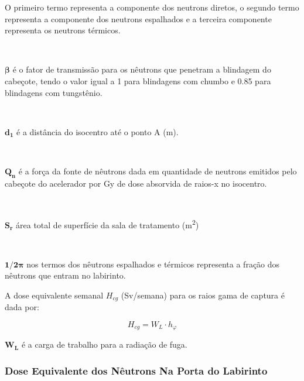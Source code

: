 \documentclass[11pt,a4paper]{article}
\newcounter{exemplo}
\begin{document}
        \begin{exemplo}[onde:]
                O primeiro termo representa a componente dos neutrons diretos, o segundo termo representa a componente dos neutrons espalhados e a terceira componente representa os neutrons térmicos.

                \

                \textcolor{CarnationPink}{$\mathbf{\beta}$} é o fator de transmissão para os nêutrons que penetram a blindagem do cabeçote, tendo o valor igual a 1 para blindagens com chumbo e 0.85 para blindagens com tungstênio.

                \

                \textcolor{CarnationPink}{$\mathbf{d_1}$} é a distância do isocentro até o ponto A (m).

                \

                \textcolor{CarnationPink}{$\mathbf{Q_n}$} é a força da fonte de nêutrons dada em quantidade de neutrons emitidos pelo cabeçote do acelerador por Gy de dose absorvida de raios-x no isocentro.

                \

                \textcolor{CarnationPink}{$\mathbf{S_r}$} área total de superfície  da sala de tratamento (\unit{m^2})

                \

                \textcolor{CarnationPink}{$\mathbf{1/2\pi}$} nos termos dos nêutrons espalhados e térmicos representa a fração dos nêutrons que entram no labirinto.
        \end{exemplo}

        A dose equivalente semanal $H_{cg}$ (Sv/semana) para os raios gama de captura é dada por:

            \begin{equation}
                H_{cg} = W_L \cdot h_{\varphi}
                \label{eq:doseEquivalenteRaiosGamaCaptura}
            \end{equation}

        \begin{exemplo}[onde:]
            \textcolor{CarnationPink}{$\mathbf{W_L}$} é a carga de trabalho para a radiação de fuga.
        \end{exemplo}

    \subsubsection{Dose Equivalente dos Nêutrons Na Porta do Labirinto}
\end{document}
